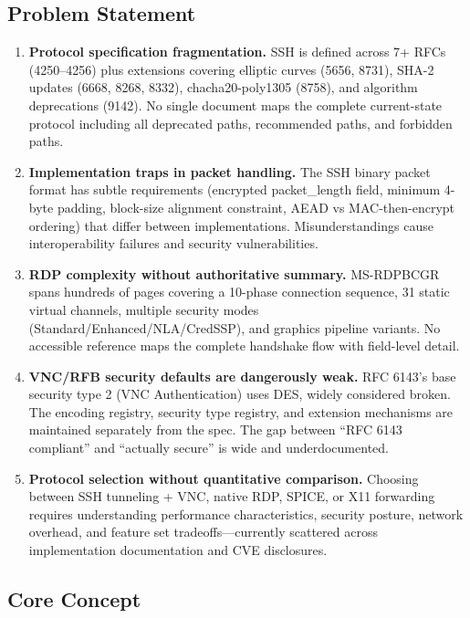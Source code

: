 \documentclass[11pt,letterpaper]{article}
\begin{document}
\subsection{Problem Statement}

\begin{enumerate}[leftmargin=*, label=\textbf{P\arabic*.}]
\item \textbf{Protocol specification fragmentation.} SSH is defined across 7+ RFCs (4250--4256) plus extensions covering elliptic curves (5656, 8731), SHA-2 updates (6668, 8268, 8332), chacha20-poly1305 (8758), and algorithm deprecations (9142). No single document maps the complete current-state protocol including all deprecated paths, recommended paths, and forbidden paths.

\item \textbf{Implementation traps in packet handling.} The SSH binary packet format has subtle requirements (encrypted packet\_length field, minimum 4-byte padding, block-size alignment constraint, AEAD vs MAC-then-encrypt ordering) that differ between implementations. Misunderstandings cause interoperability failures and security vulnerabilities.

\item \textbf{RDP complexity without authoritative summary.} MS-RDPBCGR spans hundreds of pages covering a 10-phase connection sequence, 31 static virtual channels, multiple security modes (Standard/Enhanced/NLA/CredSSP), and graphics pipeline variants. No accessible reference maps the complete handshake flow with field-level detail.

\item \textbf{VNC/RFB security defaults are dangerously weak.} RFC 6143's base security type 2 (VNC Authentication) uses DES, widely considered broken. The encoding registry, security type registry, and extension mechanisms are maintained separately from the spec. The gap between ``RFC 6143 compliant'' and ``actually secure'' is wide and underdocumented.

\item \textbf{Protocol selection without quantitative comparison.} Choosing between SSH tunneling + VNC, native RDP, SPICE, or X11 forwarding requires understanding performance characteristics, security posture, network overhead, and feature set tradeoffs---currently scattered across implementation documentation and CVE disclosures.
\end{enumerate}

\subsection{Core Concept}
\end{document}
